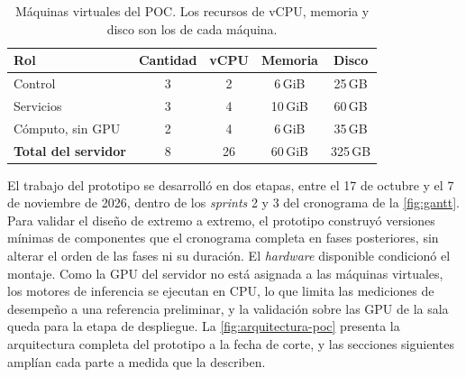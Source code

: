\begin{table}[htbp]
  \centering
  \caption{Máquinas virtuales del POC. Los recursos de vCPU, memoria y disco son los de cada máquina.}
  \label{tab:vm-poc}
  \begin{tabular}{l c c c c}
    \toprule
    \textbf{Rol} & \textbf{Cantidad} & \textbf{vCPU} & \textbf{Memoria} & \textbf{Disco} \\
    \midrule
    Control & 3 & 2 & 6\,GiB & 25\,GB \\
    Servicios & 3 & 4 & 10\,GiB & 60\,GB \\
    Cómputo, sin GPU & 2 & 4 & 6\,GiB & 35\,GB \\
    \midrule
    \textbf{Total del servidor} & 8 & 26 & 60\,GiB & 325\,GB \\
    \bottomrule
  \end{tabular}
\end{table}

El trabajo del prototipo se desarrolló en dos etapas, entre el 17 de octubre y el 7 de noviembre de 2026, dentro de los \emph{sprints} 2 y 3 del cronograma de la \cref{fig:gantt}. Para validar el diseño de extremo a extremo, el prototipo construyó versiones mínimas de componentes que el cronograma completa en fases posteriores, sin alterar el orden de las fases ni su duración. El \emph{hardware} disponible condicionó el montaje. Como la GPU del servidor no está asignada a las máquinas virtuales, los motores de inferencia se ejecutan en CPU, lo que limita las mediciones de desempeño a una referencia preliminar, y la validación sobre las GPU de la sala queda para la etapa de despliegue. La \cref{fig:arquitectura-poc} presenta la arquitectura completa del prototipo a la fecha de corte, y las secciones siguientes amplían cada parte a medida que la describen.

